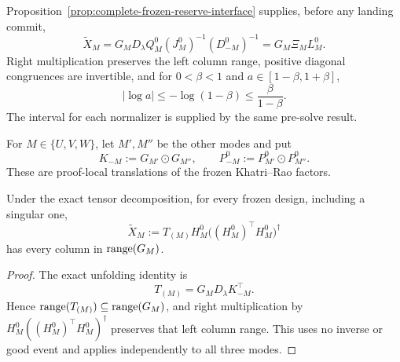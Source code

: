 Proposition~\ref{prop:complete-frozen-reserve-interface} supplies, before any
landing commit,
\[
\widetilde X_M
=G_MD_\lambda Q_M^0(J_M^0)^{-1}(D_{-M}^0)^{-1}
=G_M\Xi_ML_M^0. \tag{C1}
\]
Right multiplication preserves the left column range, positive diagonal
congruences are invertible, and for $0<\beta<1$ and
$a\in[1-\beta,1+\beta]$,
\[
|\log a|\le-\log(1-\beta)\le\frac{\beta}{1-\beta}. \tag{C2}
\]
The interval for each normalizer is supplied by the same pre-solve result.

For \(M\in\{U,V,W\}\), let \(M',M''\) be the other modes and put
\[
K_{-M}:=G_{M'}\odot G_{M''},\qquad
P_{-M}^0:=P_{M'}^0\odot P_{M''}^0.
\]
These are proof-local translations of the frozen Khatri--Rao factors.


\begin{lemma}\label{lem:step-010-range}
Under the exact tensor decomposition, for every frozen
design, including a singular one,
\[
\widetilde X_M:=T_{(M)}H_M^0\big((H_M^0)^\top H_M^0\big)^\dagger
\]
has every column in \({\rm range}(G_M)\).

\begin{proof}
The exact unfolding identity is
\[
T_{(M)}=G_MD_\lambda K_{-M}^{\top}. \tag{1}
\]
Hence \({\rm range}(T_{(M)})\subseteq{\rm range}(G_M)\), and right
multiplication by \(H_M^0((H_M^0)^\top H_M^0)^\dagger\) preserves that
left column range.  This uses no inverse or good event and applies
independently to all three modes.


\end{proof}
\end{lemma}
